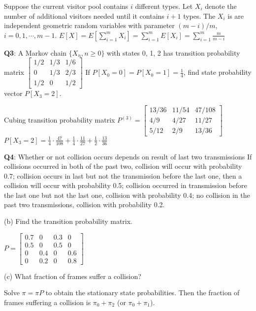 \documentclass{scrartcl}
\begin{document}
\begin{multicols*}{3}
Suppose the current visitor pool contains $i$ different types. Let $X_i$ denote the number of additional visitors needed until it contains $i + 1$ types. The $X_i$ is are independent geometric random variables with parameter $(m - i)/m$, $i = 0, 1, \cdots, m-1$. $E[X]=E[\sum_{i=1}^mX_i]=\sum_{i=1}^mE[X_i]=\sum_{i=1}^m\frac{m}{m-i}$



{\bf Q3}: A Markov chain $\{X_n,n\geq0\}$ with states 0, 1, 2 has transition probability matrix $\begin{bmatrix}
1/2 & 1/3 & 1/6 \\
0 & 1/3 & 2/3 \\
1/2 & 0 & 1/2
\end{bmatrix}$
If $P[X_0=0]=P[X_0=1]=\frac{1}{4}$, find state probability vector $P[X_3=2]$.

Cubing transition probability matrix $P^{(3)}=\begin{bmatrix}
13/36 & 11/54 & 47/108 \\
4/9 & 4/27 & 11/27 \\
5/12 & 2/9 & 13/36
\end{bmatrix}$
$P[X_3=2]=\frac{1}{4}\cdot\frac{47}{108}+\frac{1}{4}\cdot\frac{11}{27}+\frac{1}{2}\cdot\frac{13}{36}$



{\bf Q4}: Whether or not collision occurs depends on result of last two transmissions If collisions occurred in both of the past two, collision will occur with probability 0.7; collision occurs in last but not the transmission before the last one, then a collision will occur with probability 0.5; collision occurred in transmission before the last one but not the last one, collision with probability 0.4; no collision in the past two transmissions, collision with probability 0.2.

(b) Find the transition probability matrix.

$P=\begin{bmatrix}0.7 & 0 & 0.3 & 0 \\ 0.5 & 0 & 0.5 & 0 \\ 0 & 0.4 & 0 & 0.6 \\ 0 & 0.2 & 0 & 0.8\end{bmatrix}$

(c) What fraction of frames suffer a collision?

Solve $\pi = \pi P$ to obtain the stationary state probabilities. Then the fraction of frames suffering a collision is $\pi_0 + \pi_2$ (or $\pi_0 + \pi_1$).




\end{multicols*}
\end{document}
